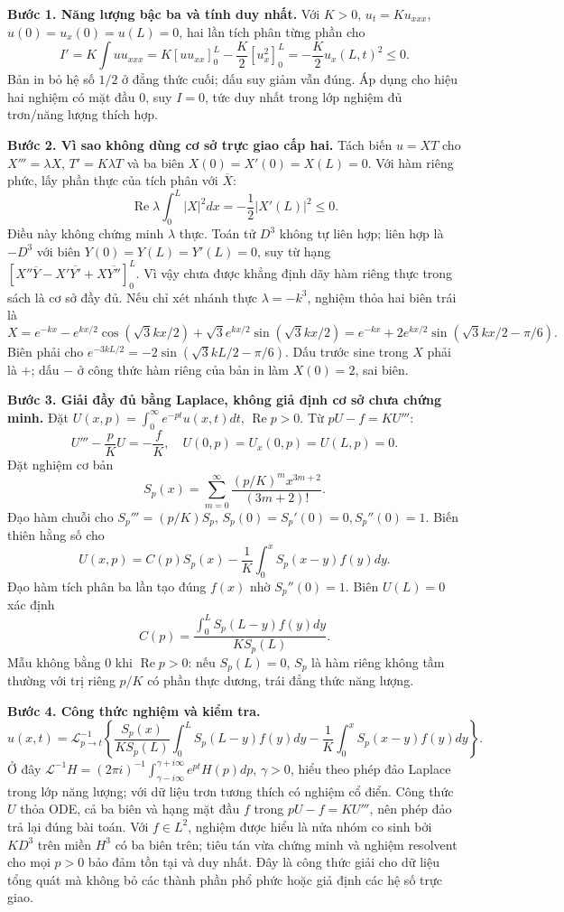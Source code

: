 \textbf{Bước 1. Năng lượng bậc ba và tính duy nhất.}
Với $K>0$, $u_t=Ku_{xxx}$, $u(0)=u_x(0)=u(L)=0$, hai lần tích phân từng phần cho
\[I'=K\int uu_{xxx}
=K[uu_{xx}]_0^L-\frac K2[u_x^2]_0^L
=-\frac K2u_x(L,t)^2\le0.\]
Bản in bỏ hệ số $1/2$ ở đẳng thức cuối; dấu suy giảm vẫn đúng. Áp dụng cho hiệu hai nghiệm có mặt đầu $0$, suy $I=0$, tức duy nhất trong lớp nghiệm đủ trơn/năng lượng thích hợp.

\textbf{Bước 2. Vì sao không dùng cơ sở trực giao cấp hai.}
Tách biến $u=XT$ cho $X'''=\lambda X$, $T'=K\lambda T$ và ba biên $X(0)=X'(0)=X(L)=0$. Với hàm riêng phức, lấy phần thực của tích phân với $\overline X$:
\[\operatorname{Re}\lambda\int_0^L|X|^2dx=-\frac12|X'(L)|^2\le0.\]
Điều này không chứng minh $\lambda$ thực. Toán tử $D^3$ không tự liên hợp; liên hợp là $-D^3$ với biên $Y(0)=Y(L)=Y'(L)=0$, suy từ hạng $[X''\overline Y-X'\overline{Y'}+X\overline{Y''}]_0^L$. Vì vậy chưa được khẳng định dãy hàm riêng thực trong sách là cơ sở đầy đủ.
Nếu chỉ xét nhánh thực $\lambda=-k^3$, nghiệm thỏa hai biên trái là
\[X=e^{-kx}-e^{kx/2}\cos(\sqrt3kx/2)+\sqrt3e^{kx/2}\sin(\sqrt3kx/2)
=e^{-kx}+2e^{kx/2}\sin(\sqrt3kx/2-\pi/6).\]
Biên phải cho $e^{-3kL/2}=-2\sin(\sqrt3kL/2-\pi/6)$. Dấu trước sine trong $X$ phải là $+$; dấu $-$ ở công thức hàm riêng của bản in làm $X(0)=2$, sai biên.

\textbf{Bước 3. Giải đầy đủ bằng Laplace, không giả định cơ sở chưa chứng minh.}
Đặt $U(x,p)=\int_0^\infty e^{-pt}u(x,t)dt$, $\operatorname{Re}p>0$. Từ $pU-f=KU'''$:
\[U'''-\frac pK U=-\frac fK,\quad U(0,p)=U_x(0,p)=U(L,p)=0.\]
Đặt nghiệm cơ bản
\[S_p(x)=\sum_{m=0}^\infty\frac{(p/K)^m x^{3m+2}}{(3m+2)!}.\]
Đạo hàm chuỗi cho $S_p'''=(p/K)S_p$, $S_p(0)=S_p'(0)=0,S_p''(0)=1$. Biến thiên hằng số cho
\[U(x,p)=C(p)S_p(x)-\frac1K\int_0^xS_p(x-y)f(y)dy.\]
Đạo hàm tích phân ba lần tạo đúng $f(x)$ nhờ $S_p''(0)=1$. Biên $U(L)=0$ xác định
\[C(p)=\frac{\int_0^LS_p(L-y)f(y)dy}{KS_p(L)}.\]
Mẫu không bằng $0$ khi $\operatorname{Re}p>0$: nếu $S_p(L)=0$, $S_p$ là hàm riêng không tầm thường với trị riêng $p/K$ có phần thực dương, trái đẳng thức năng lượng.

\textbf{Bước 4. Công thức nghiệm và kiểm tra.}
\[
u(x,t)=\mathcal L^{-1}_{p\to t}
\left\{\frac{S_p(x)}{KS_p(L)}\int_0^LS_p(L-y)f(y)dy
-\frac1K\int_0^xS_p(x-y)f(y)dy\right\}.
\]
Ở đây $\mathcal L^{-1}H=(2\pi i)^{-1}\int_{\gamma-i\infty}^{\gamma+i\infty}e^{pt}H(p)dp$, $\gamma>0$, hiểu theo phép đảo Laplace trong lớp năng lượng; với dữ liệu trơn tương thích có nghiệm cổ điển. Công thức $U$ thỏa ODE, cả ba biên và hạng mặt đầu $f$ trong $pU-f=KU'''$, nên phép đảo trả lại đúng bài toán. Với $f\in L^2$, nghiệm được hiểu là nửa nhóm co sinh bởi $KD^3$ trên miền $H^3$ có ba biên trên; tiêu tán vừa chứng minh và nghiệm resolvent cho mọi $p>0$ bảo đảm tồn tại và duy nhất. Đây là công thức giải cho dữ liệu tổng quát mà không bỏ các thành phần phổ phức hoặc giả định các hệ số trực giao.

